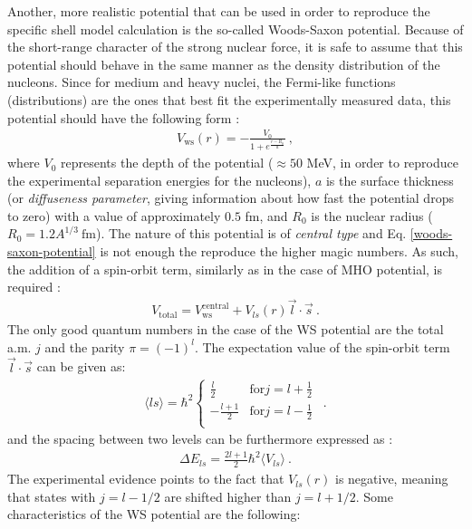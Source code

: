 Another, more realistic potential that can be used in order to reproduce the specific shell model calculation is the so-called Woods-Saxon potential. Because of the short-range character of the strong nuclear force, it is safe to assume that this potential should behave in the same manner as the density distribution of the nucleons. Since for medium and heavy nuclei, the Fermi-like functions (distributions) are the ones that best fit the experimentally measured data, this potential should have the following form \cite{woods1954diffuse}:
\begin{align}
    V_\text{ws}(r)=-\frac{V_0}{1+e^{\frac{r-R_0}{a}}}\ ,
    \label{woods-saxon-potential}
\end{align}
where $V_0$ represents the depth of the potential ($\approx 50$ MeV, in order to reproduce the experimental separation energies for the nucleons), $a$ is the surface thickness (or \emph{diffuseness parameter}, giving information about how fast the potential drops to zero) with a value of approximately $0.5$ fm, and $R_0$ is the nuclear radius ($R_0=1.2A^{1/3}\ \text{fm}$). The nature of this potential is of \emph{central type} and Eq. \ref{woods-saxon-potential} is not enough the reproduce the higher magic numbers. As such, the addition of a spin-orbit term, similarly as in the case of MHO potential, is required \cite{martin2017particle}: 
\begin{align}
    V_\text{total}=V_\text{ws}^\text{central}+V_{ls}(r)\vec{l}\cdot\vec{s}\ .
    \label{woods-saxon-so-potential}
\end{align}
The only good quantum numbers in the case of the WS potential are the total a.m. $j$ and the parity $\pi=(-1)^l$.
The expectation value of the spin-orbit term $\vec{l}\cdot\vec{s}$ can be given as:
\begin{align}
    \langle ls \rangle=\hbar^2\begin{cases}
        \frac{l}{2} \quad &\text{for} j=l+\frac{1}{2}\\
        -\frac{l+1}{2} &\text{for} j=l-\frac{1}{2}\ \\
    \end{cases}\ .
\end{align}
and the spacing between two levels can be furthermore expressed as \cite{martin2017particle}:
\begin{align}
    \Delta E_{ls}=\frac{2l+1}{2}\hbar^2\langle V_{ls}\rangle\ .
\end{align}
The experimental evidence points to the fact that $V_{ls}(r)$ is negative, meaning that states with $j=l-1/2$ are shifted higher than $j=l+1/2$. Some characteristics of the WS potential are the following:
